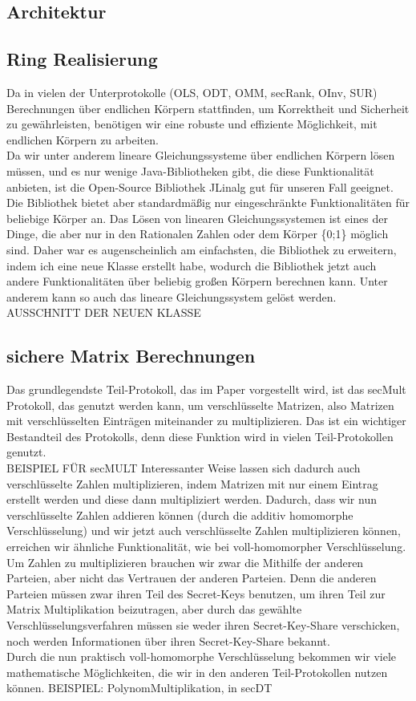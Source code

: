 \documentclass[a4paper,10pt]{scrartcl}
\begin{document}
\subsection{Architektur}
\subsection{Ring Realisierung}
Da in vielen der Unterprotokolle (OLS, ODT, OMM, secRank, OInv, SUR) Berechnungen über endlichen Körpern stattfinden, um Korrektheit und Sicherheit zu gewährleisten, benötigen wir eine robuste und effiziente Möglichkeit, mit endlichen Körpern zu arbeiten.\\
Da wir unter anderem lineare Gleichungssysteme über endlichen Körpern lösen müssen, und es nur wenige Java-Bibliotheken gibt, die diese Funktionalität anbieten, ist die Open-Source Bibliothek JLinalg \cite{JLinAlg} gut für unseren Fall geeignet. Die Bibliothek bietet aber standardmäßig nur eingeschränkte Funktionalitäten für beliebige Körper an. Das Lösen von linearen Gleichungssystemen ist eines der Dinge, die aber nur in den  Rationalen Zahlen oder dem Körper \{0;1\} möglich sind. Daher war es augenscheinlich am einfachsten, die Bibliothek zu erweitern, indem ich eine neue Klasse erstellt habe, wodurch die Bibliothek jetzt auch andere Funktionalitäten über beliebig großen Körpern berechnen kann. Unter anderem kann so auch das lineare Gleichungssystem gelöst werden.\\

AUSSCHNITT DER NEUEN KLASSE



\subsection{sichere Matrix Berechnungen}
Das grundlegendste Teil-Protokoll, das im Paper \cite{Doettling2021} vorgestellt wird, ist das secMult Protokoll, das genutzt werden kann, um verschlüsselte Matrizen, also Matrizen mit verschlüsselten Einträgen miteinander zu multiplizieren. Das ist ein wichtiger Bestandteil des Protokolls, denn diese Funktion wird in vielen Teil-Protokollen genutzt.\\
BEISPIEL FÜR secMULT
Interessanter Weise lassen sich dadurch auch verschlüsselte Zahlen multiplizieren, indem Matrizen mit nur einem Eintrag erstellt werden und diese dann multipliziert werden. Dadurch, dass wir nun verschlüsselte Zahlen addieren können (durch die additiv homomorphe Verschlüsselung) und wir jetzt auch verschlüsselte Zahlen multiplizieren können, erreichen wir ähnliche Funktionalität, wie bei voll-homomorpher Verschlüsselung. Um Zahlen zu multiplizieren brauchen wir zwar die Mithilfe der anderen Parteien, aber nicht das Vertrauen der anderen Parteien. Denn die anderen Parteien müssen zwar ihren Teil des Secret-Keys benutzen, um ihren Teil zur Matrix Multiplikation beizutragen, aber durch das gewählte Verschlüsselungsverfahren müssen sie weder ihren Secret-Key-Share verschicken, noch werden Informationen über ihren Secret-Key-Share bekannt.\\
Durch die nun praktisch voll-homomorphe Verschlüsselung bekommen wir viele mathematische Möglichkeiten, die wir in den anderen Teil-Protokollen nutzen können.
BEISPIEL: PolynomMultiplikation, in secDT
\end{document}
